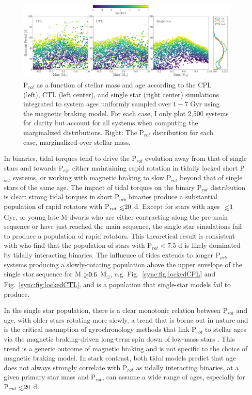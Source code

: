 \begin{figure}
	\includegraphics[width=\columnwidth]{protDist.pdf}
   \caption{P$_{rot}$ as a function of stellar mass and age according to the CPL (left), CTL (left center), and single star (right center) simulations integrated to system ages uniformly sampled over $1-7$ Gyr using the \citet{Matt2015} magnetic braking model. For each case, I only plot 2,500 systems for clarity but account for all systems when computing the marginalized distributions. Right: The P$_{rot}$ distribution for each case, marginalized over stellar mass.}%
    \label{sync:fig:protDist}%
\end{figure}

In binaries, tidal torques tend to drive the P$_{rot}$ evolution away from that of single stars and towards P$_{eq}$, either maintaining rapid rotation in tidally locked short P$_{orb}$ systems, or working with magnetic braking to slow P$_{rot}$ beyond that of single stars of the same age. The impact of tidal torques on the binary P$_{rot}$ distribution is clear: strong tidal torques in short P$_{orb}$ binaries produce a substantial population of rapid rotators with P$_{rot} \lsim 20$ d. Except for stars with ages $\lsim 1$ Gyr, or young late M-dwarfs who are either contracting along the pre-main sequence or have just reached the main sequence, the single star simulations fail to produce a population of rapid rotators. This theoretical result is consistent with \citet{Simonian2018} who find that the population of \kepler stars with P$_{rot} < 7.5$ d is likely dominated by tidally interacting binaries.  The influence of tides extends to longer P$_{orb}$ systems producing a slowly-rotating population above the upper envelope of the single star sequence for M$ \gsim 0.6$ M$_{\odot}$, e.g. Fig.~\ref{sync:fig:lockedCPL} and Fig.~\ref{sync:fig:lockedCTL}, and is a population that single-star models fail to produce. 

In the single star population, there is a clear monotonic relation between P$_{rot}$ and age, with older stars rotating more slowly, a trend that is borne out in nature and is the critical assumption of gyrochronology methods that link P$_{rot}$ to stellar ages via the magnetic braking-driven long-term spin down of low-mass stars \citep[e.g.][]{Skumanich1972,Barnes2003,Barnes2007,Mamajek2008,Barnes2010,Meibom2015}. This trend is a generic outcome of magnetic braking and is not specific to the choice of magnetic braking model. In stark contrast, both tidal models predict that age does not always strongly correlate with P$_{rot}$ as tidally interacting binaries, at a given primary star mass and P$_{rot}$, can assume a wide range of ages, especially for P$_{rot} \lsim 20$ d. 

